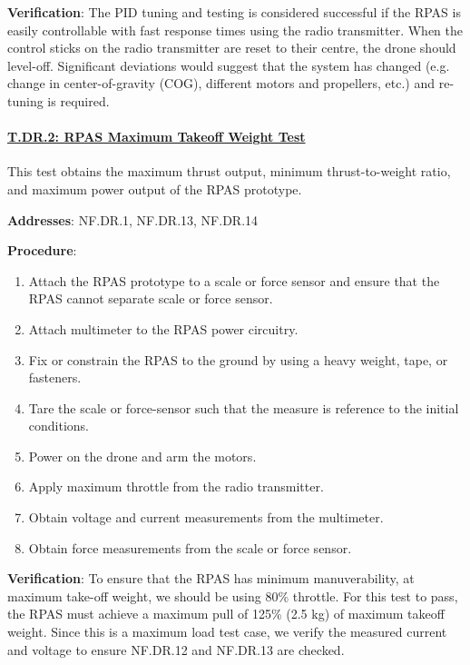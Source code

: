 \textbf{Verification}: The PID tuning and testing is considered successful if the RPAS is easily controllable with fast response times using the radio transmitter. When the control sticks on the radio transmitter are reset to their centre, the drone should level-off. Significant deviations would suggest that the system has changed (e.g. change in center-of-gravity (COG), different motors and propellers, etc.) and re-tuning is required. 

% 

\paragraph{\underline{T.DR.2: RPAS Maximum Takeoff Weight Test}}

This test obtains the maximum thrust output, minimum thrust-to-weight ratio, and maximum power output of the RPAS prototype.

\textbf{Addresses}:  NF.DR.1, NF.DR.13, NF.DR.14

\textbf{Procedure}:
\begin{enumerate}[noitemsep]
    \item Attach the RPAS prototype to a scale or force sensor and ensure that the RPAS cannot separate scale or force sensor.
    \item Attach multimeter to the RPAS power circuitry.
    \item Fix or constrain the RPAS to the ground by using a heavy weight, tape, or fasteners.
    \item Tare the scale or force-sensor such that the measure is reference to the initial conditions.
    \item Power on the drone and arm the motors.
    \item Apply maximum throttle from the radio transmitter.
    \item Obtain voltage and current measurements from the multimeter.
    \item Obtain force measurements from the scale or force sensor.
\end{enumerate}

\textbf{Verification}: 
To ensure that the RPAS has minimum manuverability, at maximum take-off weight, we should be using 80\% throttle. For this test to pass, the RPAS must achieve a maximum pull of 125\% (2.5 kg) of maximum takeoff weight. Since this is a maximum load test case, we verify the measured current and voltage to ensure NF.DR.12 and NF.DR.13 are checked.

% 

